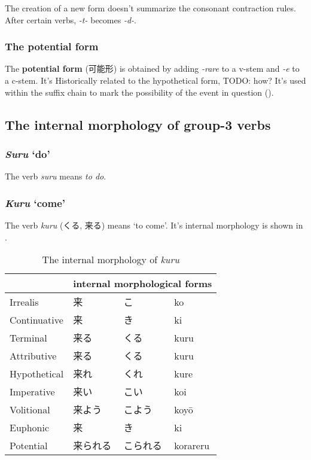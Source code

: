 \documentclass[UTF8, a4paper, oneside, scheme=plain]{ctexrep}
\newcommand*{\concept}[1]{\textbf{#1}}
\newcommand{\corpus}[1]{\emph{#1}}
\newcommand{\translate}[1]{`#1'}
\begin{document}
The creation of a new form doesn't summarize the consonant contraction rules.
After certain verbs, \corpus{-t-} becomes \corpus{-d-}.

\subsubsection{The potential form}\label{sec:potential-form}

The \concept{potential form} (可能形) is obtained by adding \corpus{-rare} to a v-stem 
and \corpus{-e} to a c-stem.
It's Historically related to the hypothetical form, TODO: how?
It's used within the suffix chain to mark the possibility of the event in question 
().

\subsection{The internal morphology of group-3 verbs}

\subsubsection{\corpus{Suru} \translate{do}}

The verb \corpus{suru} means \corpus{to do}. 

\subsubsection{\corpus{Kuru} \translate{come}}

The verb \corpus{kuru} (くる, 来る) means \translate{to come}.
It's internal morphology is shown in .

\begin{table}[H]
\caption{The internal morphology of \corpus{kuru}}
\label{tbl:kuru-table}
\centering
\begin{tabular}{llll}
\toprule
                & \multicolumn{3}{l}{internal morphological forms} \\ \midrule
Irrealis     & 来             & こ             & ko               \\
Continuative & 来             & き             & ki               \\
Terminal     & 来る            & くる            & kuru             \\
Attributive  & 来る            & くる            & kuru             \\
Hypothetical & 来れ            & くれ            & kure             \\
Imperative   & 来い            & こい            & koi              \\
Volitional   & 来よう           & こよう           & koyō             \\
Euphonic     & 来             & き             & ki               \\
Potential    & 来られる          & こられる          & korareru        \\ 
\bottomrule
\end{tabular}
\end{table}
\end{document}
